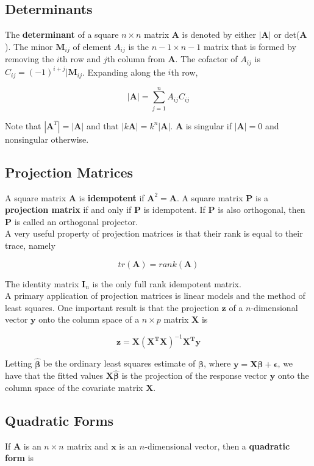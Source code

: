 \documentclass[11pt]{article}
\theoremstyle{definition}
\begin{document}
\subsection{Determinants}
The \textbf{determinant} of a square $n \times n$ matrix $\mathbf{A}$ is denoted by either $|\mathbf{A}|$ or det($\mathbf{A}$).  The minor $\mathbf{M}_{ij}$ of element $A_{ij}$ is the $n - 1 \times n-1$ matrix that is formed by removing the $i$th row and $j$th column from $\mathbf{A}$.  The cofactor of $A_{ij}$ is $C_{ij} = (-1)^{i + j}|\mathbf{M}_{ij}$.  Expanding along the $i$th row, 

$$|\mathbf{A}| = \sum_{j = 1}^n A_{ij}C_{ij}$$

Note that $|\mathbf{A}^T| = |\mathbf{A}|$ and that $|k\mathbf{A}| = k^n|\mathbf{A}|$.  $\mathbf{A}$ is singular if $|\mathbf{A}| = 0$ and nonsingular otherwise.

\subsection{Projection Matrices}
A square matrix $\mathbf{A}$ is \textbf{idempotent} if $\mathbf{A}^2 = \mathbf{A}$.  A square matrix $\mathbf{P}$ is a \textbf{projection matrix} if and only if $\mathbf{P}$ is idempotent.  If $\mathbf{P}$ is also orthogonal, then $\mathbf{P}$ is called an orthogonal projector.\\

A very useful property of projection matrices is that their rank is equal to their trace, namely

\[tr(\mathbf{A}) = rank(\mathbf{A})\]

The identity matrix $\mathbf{I}_n$ is the only full rank idempotent matrix.  \\

A primary application of projection matrices is linear models and the method of least squares.  One important result is that the projection $\mathbf{z}$ of a $n$-dimensional vector $\mathbf{y}$ onto the column space of a $n \times p$ matrix $\mathbf{X}$ is

\[\mathbf{z} = \mathbf{X(X^TX)}^{-1}\mathbf{X^Ty}\]

Letting $\mathbf{\hat{\beta}}$ be the ordinary least squares estimate of $\mathbf{\beta}$, where $\mathbf{y} = \mathbf{X\beta} + \mathbf{\epsilon}$, we have that the fitted values $\mathbf{X}\hat{\mathbf{\beta}}$ is the projection of the response vector $\mathbf{y}$ onto the column space of the covariate matrix $\mathbf{X}$.

\subsection{Quadratic Forms}
If $\mathbf{A}$ is an $n \times n$ matrix and $\mathbf{x}$ is an $n$-dimensional vector, then a \textbf{quadratic form} is 
\end{document}
